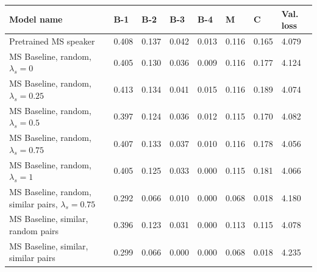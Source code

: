 \begin{table}[]
	\begin{tabularx}{\textwidth}{|X|l|l|l|l|l|l|l|}
		\hline
		\textbf{Model name}                                    & \textbf{B-1} & \textbf{B-2} & \textbf{B-3} & \textbf{B-4} & \textbf{M} & \textbf{C} & \textbf{Val. loss} \\ \hline
		Pretrained MS speaker                             & 0.408           & 0.137           & 0.042           & 0.013           & 0.116           & 0.165          & 4.079                    \\ \hline
		MS Baseline, random, $\lambda_s = 0$      &   0.405              &      0.130           &     0.036            &     0.009            &     0.116            &     0.177           &           4.124               \\ \hline
		MS Baseline, random, $\lambda_s = 0.25$   &          0.413       &       0.134          &      0.041          &       0.015          &       0.116          &       0.189        &           4.074               \\ \hline
		MS Baseline, random, $\lambda_s = 0.5$   &          0.397       &       0.124          &      0.036          &       0.012          &       0.115          &       0.170         &           4.082               \\ \hline
		MS Baseline, random, $\lambda_s = 0.75$   & 0.407           & 0.133           & 0.037           & 0.010           & 0.116           & 0.178          & 4.056                    \\ \hline
		MS Baseline, random, $\lambda_s = 1$   &    0.405             &   0.125              &    0.033             &  0.000              &         0.115        &       0.181         &         4.066                 \\ \hline
		MS Baseline, random, similar pairs, $\lambda_s = 0.75$   &    0.292           &   0.066              &    0.010           &  0.000              &         0.068       &       0.018        &         4.180        \\ \hline
		MS Baseline, similar, random pairs  &     0.396            &          0.123       &       0.031         &        0.000         &   0.113         &      0.115          &      4.078                   \\ \hline
		MS Baseline, similar, similar pairs  &     0.299       &          0.066       &       0.000          &        0.000         &   0.068              &      0.018          &      4.235                    \\ \hline

\end{tabularx}
\end{table}
